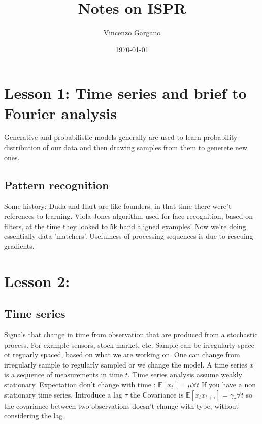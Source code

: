 \documentclass[12pt]{book}
\title{Notes on ISPR}
\author{Vincenzo Gargano}
\begin{document}

\date{\today}

\maketitle

\tableofcontents
\clearpage

\chapter{Lesson 1: Time series and brief to Fourier analysis}

Generative and probabilistic models generally are used to learn probability distribution of our data and then drawing samples from them to generete new ones.

\section{Pattern recognition}
Some history: Duda and Hart are like founders, in that time there were't references to learning. Viola-Jones algorithm used for face recognition, based on filters, at the time they looked to 5k hand aligned examples!\newline
Now we're doing essentially data 'matchers'. Usefulness of processing sequences is due to rescuing gradients. 

\chapter{Lesson 2:  }

\section{Time series}
Signals that change in time from observation that are produced from a stochastic process. For example sensors, stock market, etc. \newline
Sample can be irregularly space ot reguarly spaced, based on what we are working on. \newline
One can change from irregularly sample to regularly sampled or we change the model.\newline
A time series $x$ is a sequence of measurements in time $t$.
Time series analysis assume weakly stationary.\newline
Expectation don't change with time : $\mathbb{E}[x_t]=\mu \forall t$ \newline
If you have a non stationary time series, 
Introduce a lag $\tau$ the Covariance is $\mathbb{E}[x_t x_{t+\tau}]= \gamma_\tau \forall t$ so the covariance between two observations doesn't change with type, without considering the lag\newline
\end{document}
